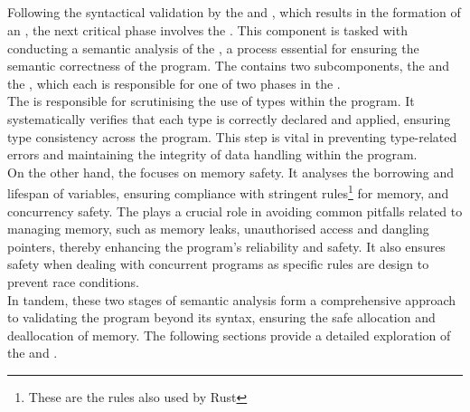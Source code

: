 \subsection{\static}

Following the syntactical validation by the \lexer{} and \parser{}, which results in
the formation of an \ast{}, the next critical phase involves the \static{}. This
component is tasked with conducting a semantic analysis of the \ast{}, a process
essential for ensuring the semantic correctness of the program. The \static{}
contains two subcomponents, the \typeChecker{} and the \borrowChecker{}, which each is
responsible for one of two phases in the \static.\\

The \typeChecker{} is responsible for scrutinising the use of types within the
program. It systematically verifies that each type is correctly declared and applied,
ensuring type consistency across the program. This step is vital in preventing
type-related errors and maintaining the integrity of data handling within the
program. \\

On the other hand, the \borrowChecker{} focuses on memory safety. It analyses the
borrowing and lifespan of variables, ensuring compliance with stringent
rules\footnote{These are the rules also used by Rust} for memory, and concurrency
safety\cite{RUST}. The \borrowChecker{} plays a crucial role in avoiding common
pitfalls related to managing memory, such as memory leaks, unauthorised access and
dangling pointers, thereby enhancing the program's reliability and safety. It also
ensures safety when dealing with concurrent programs as specific rules are design to
prevent race conditions.\\

In tandem, these two stages of semantic analysis form a comprehensive approach to
validating the program beyond its syntax, ensuring the
safe allocation and deallocation of memory. The following sections provide a detailed
exploration of the \typeChecker{} and \borrowChecker.



